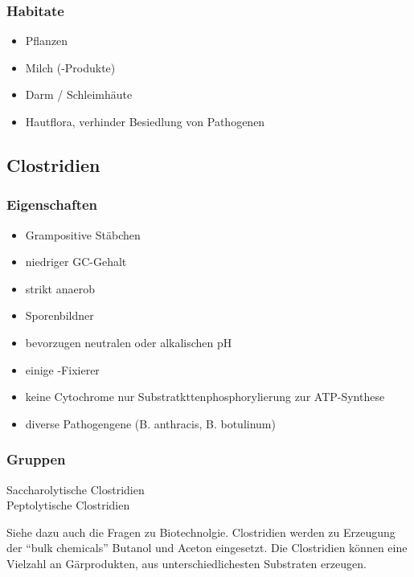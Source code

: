 \subsubsection*{Habitate}
\begin{itemize}
	\item Pflanzen
	\item Milch (-Produkte)
	\item Darm / Schleimhäute
	\item Hautflora, verhinder Besiedlung von Pathogenen
\end{itemize}

\subsection{Clostridien}

\subsubsection*{Eigenschaften}
\begin{itemize}
	\item Grampositive Stäbchen
	 \item niedriger GC-Gehalt
	 \item strikt anaerob
	 \item Sporenbildner
	 \item bevorzugen neutralen oder alkalischen pH
	 \item einige -Fixierer
	 \item keine Cytochrome \textrightarrow nur Substratkttenphosphorylierung zur ATP-Synthese
	 \item diverse Pathogengene (B. anthracis, B. botulinum)
\end{itemize}

\subsubsection*{Gruppen}
\begin{description}
	\item[Saccharolytische Clostridien]
	\item[Peptolytische Clostridien]
\end{description}

Siehe dazu auch die Fragen zu Biotechnolgie.
Clostridien werden zu Erzeugung der ``bulk chemicals'' Butanol
und Aceton eingesetzt.
Die Clostridien können eine Vielzahl an Gärprodukten,
aus unterschiedlichesten Substraten erzeugen.

